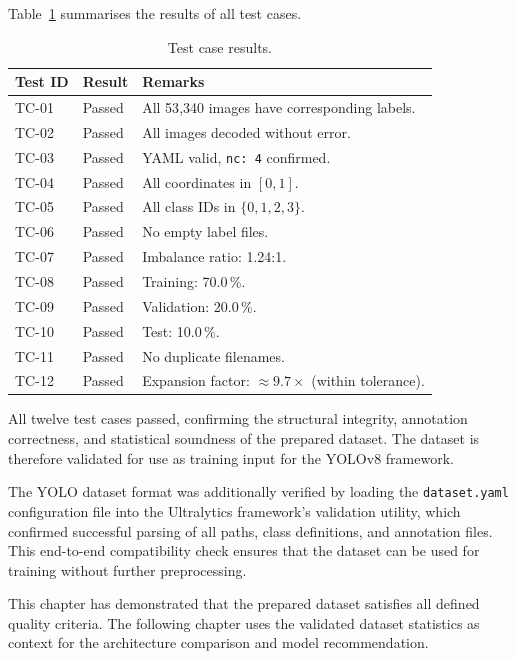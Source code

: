 \documentclass[a4paper,12pt,twoside]{report}
\begin{document}
Table~\ref{tab:test-results} summarises the results of all test cases.

\begin{table}[htbp]
  \centering
  \caption{Test case results.}
  \label{tab:test-results}
  \begin{tabular}{lll}
    \toprule
    \textbf{Test ID} & \textbf{Result} & \textbf{Remarks} \\
    \midrule
    TC-01 & Passed & All 53{,}340 images have corresponding labels. \\
    TC-02 & Passed & All images decoded without error. \\
    TC-03 & Passed & YAML valid, \texttt{nc: 4} confirmed. \\
    TC-04 & Passed & All coordinates in $[0, 1]$. \\
    TC-05 & Passed & All class IDs in $\{0, 1, 2, 3\}$. \\
    TC-06 & Passed & No empty label files. \\
    TC-07 & Passed & Imbalance ratio: 1.24:1. \\
    TC-08 & Passed & Training: 70.0\,\%. \\
    TC-09 & Passed & Validation: 20.0\,\%. \\
    TC-10 & Passed & Test: 10.0\,\%. \\
    TC-11 & Passed & No duplicate filenames. \\
    TC-12 & Passed & Expansion factor: $\approx 9.7\times$ (within tolerance). \\
    \bottomrule
  \end{tabular}
\end{table}

All twelve test cases passed, confirming the structural integrity, annotation
correctness, and statistical soundness of the prepared dataset. The dataset is
therefore validated for use as training input for the YOLOv8 framework.

The YOLO dataset format was additionally verified by loading the
\texttt{dataset.yaml} configuration file into the Ultralytics framework's
validation utility, which confirmed successful parsing of all paths, class
definitions, and annotation files. This end-to-end compatibility check ensures
that the dataset can be used for training without further preprocessing.

This chapter has demonstrated that the prepared dataset satisfies all defined
quality criteria. The following chapter uses the validated dataset statistics as
context for the architecture comparison and model recommendation.
\end{document}
